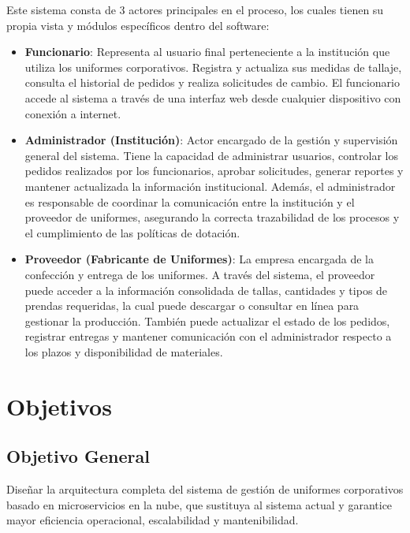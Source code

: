 Este sistema consta de 3 actores principales en el proceso, los cuales tienen su propia vista y módulos específicos dentro del software:

\begin{itemize}
    \item \textbf{Funcionario}: Representa al usuario final perteneciente a la institución que utiliza los uniformes corporativos. Registra y actualiza sus medidas de tallaje, consulta el historial de pedidos y realiza solicitudes de cambio. El funcionario accede al sistema a través de una interfaz web desde cualquier dispositivo con conexión a internet.

    \item \textbf{Administrador (Institución)}: Actor encargado de la gestión y supervisión general del sistema. Tiene la capacidad de administrar usuarios, controlar los pedidos realizados por los funcionarios, aprobar solicitudes, generar reportes y mantener actualizada la información institucional. Además, el administrador es responsable de coordinar la comunicación entre la institución y el proveedor de uniformes, asegurando la correcta trazabilidad de los procesos y el cumplimiento de las políticas de dotación.

    \item \textbf{Proveedor (Fabricante de Uniformes)}: La empresa encargada de la confección y entrega de los uniformes. A través del sistema, el proveedor puede acceder a la información consolidada de tallas, cantidades y tipos de prendas requeridas, la cual puede descargar o consultar en línea para gestionar la producción. También puede actualizar el estado de los pedidos, registrar entregas y mantener comunicación con el administrador respecto a los plazos y disponibilidad de materiales.
\end{itemize}

\section{Objetivos}

\subsection{Objetivo General}

Diseñar la arquitectura completa del sistema de gestión de uniformes corporativos basado en microservicios en la nube, que sustituya al sistema actual y garantice mayor eficiencia operacional, escalabilidad y mantenibilidad.

